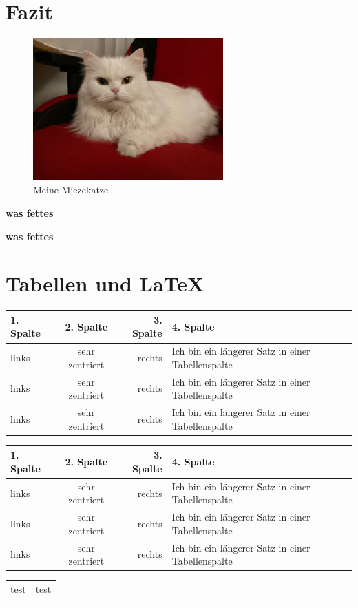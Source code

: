 \documentclass[12pt,ngerman,parskip=half]{scrartcl}
\begin{document}
\blindtext[2]

\section{Fazit}\label{sec:fazit}

\blindtext[2]


\begin{figure}[h]
\begin{center}
\includegraphics[width=0.65\textwidth,angle=90]{Bilder/Katze}
\caption{Meine Miezekatze}\label{fig:katze}
\end{center}
\end{figure}


\blindtext[2]

\textbf{was fettes}

{\bfseries was fettes}


\section{Tabellen und \LaTeX}

\begin{tabular}{|l|c|r|p{6cm}|} \hline
1. Spalte & 2. Spalte & 3. Spalte & 4. Spalte \\ \hline
links & sehr zentriert&   rechts  & Ich bin ein längerer Satz in einer Tabellenspalte  \\ \hline
links & sehr zentriert&   rechts  & Ich bin ein längerer Satz in einer Tabellenspalte  \\ \hline
links & sehr zentriert&   rechts  & Ich bin ein längerer Satz in einer Tabellenspalte  \\ \hline
\end{tabular}

\vspace*{2cm}

\begin{tabular}{lcrp{6cm}} \hline
\textbf{1. Spalte} & \textbf{2. Spalte} & \textbf{3. Spalte} & \textbf{4. Spalte} \\ \hline
links & sehr zentriert&   rechts  & Ich bin ein längerer Satz in einer Tabellenspalte  \\ \hline
links & sehr zentriert&   rechts  & Ich bin ein längerer Satz in einer Tabellenspalte  \\ \hline
links & sehr zentriert&   rechts  & Ich bin ein längerer Satz in einer Tabellenspalte  \\ \hline
\end{tabular}


 \begin{tabular}{l!{\color{green}\vrule}l}
    \hline
    test & test\\\hline
  \end{tabular}
\end{document}
